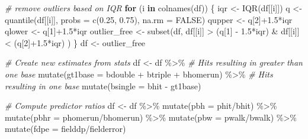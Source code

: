 \documentclass[
]{article}
\newenvironment{Shaded}{\begin{snugshade}}{\end{snugshade}}
\newcommand{\AttributeTok}[1]{\textcolor[rgb]{0.77,0.63,0.00}{#1}}
\newcommand{\CommentTok}[1]{\textcolor[rgb]{0.56,0.35,0.01}{\textit{#1}}}
\newcommand{\ConstantTok}[1]{\textcolor[rgb]{0.00,0.00,0.00}{#1}}
\newcommand{\ControlFlowTok}[1]{\textcolor[rgb]{0.13,0.29,0.53}{\textbf{#1}}}
\newcommand{\DecValTok}[1]{\textcolor[rgb]{0.00,0.00,0.81}{#1}}
\newcommand{\FloatTok}[1]{\textcolor[rgb]{0.00,0.00,0.81}{#1}}
\newcommand{\FunctionTok}[1]{\textcolor[rgb]{0.00,0.00,0.00}{#1}}
\newcommand{\NormalTok}[1]{#1}
\newcommand{\OtherTok}[1]{\textcolor[rgb]{0.56,0.35,0.01}{#1}}
\newcommand{\SpecialCharTok}[1]{\textcolor[rgb]{0.00,0.00,0.00}{#1}}
\begin{document}
\begin{Shaded}
\begin{Highlighting}[]
\CommentTok{\# remove outliers based on IQR}
\ControlFlowTok{for}\NormalTok{ (i }\ControlFlowTok{in} \FunctionTok{colnames}\NormalTok{(df)) \{}
\NormalTok{  iqr }\OtherTok{\textless{}{-}} \FunctionTok{IQR}\NormalTok{(df[[i]])}
\NormalTok{  q }\OtherTok{\textless{}{-}} \FunctionTok{quantile}\NormalTok{(df[[i]], }\AttributeTok{probs =} \FunctionTok{c}\NormalTok{(}\FloatTok{0.25}\NormalTok{, }\FloatTok{0.75}\NormalTok{), }\AttributeTok{na.rm =} \ConstantTok{FALSE}\NormalTok{)}
\NormalTok{  qupper }\OtherTok{\textless{}{-}}\NormalTok{ q[}\DecValTok{2}\NormalTok{]}\SpecialCharTok{+}\FloatTok{1.5}\SpecialCharTok{*}\NormalTok{iqr}
\NormalTok{  qlower }\OtherTok{\textless{}{-}}\NormalTok{ q[}\DecValTok{1}\NormalTok{]}\SpecialCharTok{+}\FloatTok{1.5}\SpecialCharTok{*}\NormalTok{iqr}
\NormalTok{  outlier\_free }\OtherTok{\textless{}{-}} \FunctionTok{subset}\NormalTok{(df, df[[i]] }\SpecialCharTok{\textgreater{}}\NormalTok{ (q[}\DecValTok{1}\NormalTok{] }\SpecialCharTok{{-}} \FloatTok{1.5}\SpecialCharTok{*}\NormalTok{iqr) }\SpecialCharTok{\&}\NormalTok{ df[[i]] }\SpecialCharTok{\textless{}}\NormalTok{ (q[}\DecValTok{2}\NormalTok{]}\SpecialCharTok{+}\FloatTok{1.5}\SpecialCharTok{*}\NormalTok{iqr) )}
\NormalTok{\}}
\NormalTok{df }\OtherTok{\textless{}{-}}\NormalTok{ outlier\_free}


\CommentTok{\# Create new estimates from stats}
\NormalTok{df }\OtherTok{\textless{}{-}}\NormalTok{ df }\SpecialCharTok{\%\textgreater{}\%} 
  \CommentTok{\# Hits resulting in greater than one base }
  \FunctionTok{mutate}\NormalTok{(}\AttributeTok{gt1base =}\NormalTok{ bdouble }\SpecialCharTok{+}\NormalTok{ btriple }\SpecialCharTok{+}\NormalTok{ bhomerun) }\SpecialCharTok{\%\textgreater{}\%} 
  \CommentTok{\# Hits resulting in one base}
  \FunctionTok{mutate}\NormalTok{(}\AttributeTok{bsingle =}\NormalTok{ bhit }\SpecialCharTok{{-}}\NormalTok{ gt1base)}



\CommentTok{\# Compute predictor ratios}
\NormalTok{df }\OtherTok{\textless{}{-}}\NormalTok{ df }\SpecialCharTok{\%\textgreater{}\%} 
  \FunctionTok{mutate}\NormalTok{(}\AttributeTok{pbh =}\NormalTok{ phit}\SpecialCharTok{/}\NormalTok{bhit) }\SpecialCharTok{\%\textgreater{}\%} 
  \FunctionTok{mutate}\NormalTok{(}\AttributeTok{pbhr =}\NormalTok{ phomerun}\SpecialCharTok{/}\NormalTok{bhomerun) }\SpecialCharTok{\%\textgreater{}\%} 
  \FunctionTok{mutate}\NormalTok{(}\AttributeTok{pbw =}\NormalTok{ pwalk}\SpecialCharTok{/}\NormalTok{bwalk) }\SpecialCharTok{\%\textgreater{}\%} 
  \FunctionTok{mutate}\NormalTok{(}\AttributeTok{fdpe =}\NormalTok{ fielddp}\SpecialCharTok{/}\NormalTok{fielderror)}



\end{Highlighting}
\end{Shaded}
\end{document}

